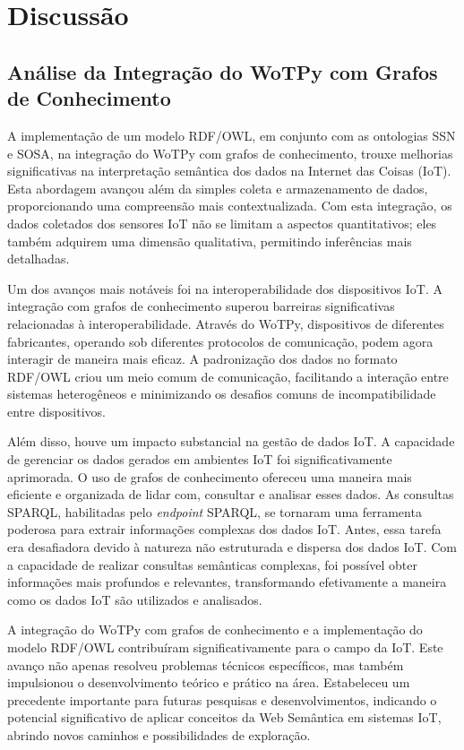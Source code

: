 \chapter{Discussão}

\section{Análise da Integração do WoTPy com Grafos de Conhecimento}

A implementação de um modelo RDF/OWL, em conjunto com as ontologias SSN e SOSA, na integração do WoTPy com grafos de conhecimento, trouxe melhorias significativas na interpretação semântica dos dados na Internet das Coisas (IoT). Esta abordagem avançou além da simples coleta e armazenamento de dados, proporcionando uma compreensão mais contextualizada. Com esta integração, os dados coletados dos sensores IoT não se limitam a aspectos quantitativos; eles também adquirem uma dimensão qualitativa, permitindo inferências mais detalhadas.

Um dos avanços mais notáveis foi na interoperabilidade dos dispositivos IoT. A integração com grafos de conhecimento superou barreiras significativas relacionadas à interoperabilidade. Através do WoTPy, dispositivos de diferentes fabricantes, operando sob diferentes protocolos de comunicação, podem agora interagir de maneira mais eficaz. A padronização dos dados no formato RDF/OWL criou um meio comum de comunicação, facilitando a interação entre sistemas heterogêneos e minimizando os desafios comuns de incompatibilidade entre dispositivos.

Além disso, houve um impacto substancial na gestão de dados IoT. A capacidade de gerenciar os dados gerados em ambientes IoT foi significativamente aprimorada. O uso de grafos de conhecimento ofereceu uma maneira mais eficiente e organizada de lidar com, consultar e analisar esses dados. As consultas SPARQL, habilitadas pelo \textit{endpoint} SPARQL, se tornaram uma ferramenta poderosa para extrair informações complexas dos dados IoT. Antes, essa tarefa era desafiadora devido à natureza não estruturada e dispersa dos dados IoT. Com a capacidade de realizar consultas semânticas complexas, foi possível obter informações mais profundos e relevantes, transformando efetivamente a maneira como os dados IoT são utilizados e analisados.

A integração do WoTPy com grafos de conhecimento e a implementação do modelo RDF/OWL contribuíram significativamente para o campo da IoT. Este avanço não apenas resolveu problemas técnicos específicos, mas também impulsionou o desenvolvimento teórico e prático na área. Estabeleceu um precedente importante para futuras pesquisas e desenvolvimentos, indicando o potencial significativo de aplicar conceitos da Web Semântica em sistemas IoT, abrindo novos caminhos e possibilidades de exploração.

